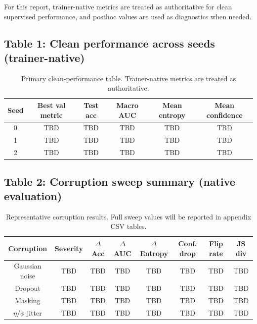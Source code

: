\documentclass[10pt]{article}
\begin{document}
For this report, trainer-native metrics are treated as authoritative for clean supervised performance, and posthoc values are used as diagnostics when needed.

\subsection*{Table 1: Clean performance across seeds (trainer-native)}
\begin{table}[h]
\centering
\small
\begin{tabular}{|c|c|c|c|c|c|}
\hline
Seed & Best val metric & Test acc & Macro AUC & Mean entropy & Mean confidence \\
\hline
0 & TBD & TBD & TBD & TBD & TBD \\
\hline
1 & TBD & TBD & TBD & TBD & TBD \\
\hline
2 & TBD & TBD & TBD & TBD & TBD \\
\hline
\end{tabular}
\caption{Primary clean-performance table. Trainer-native metrics are treated as authoritative.}
\end{table}

\subsection*{Table 2: Corruption sweep summary (native evaluation)}
\begin{table}[h]
\centering
\small
\begin{tabular}{|c|c|c|c|c|c|c|c|}
\hline
Corruption & Severity & $\Delta$Acc & $\Delta$AUC & $\Delta$Entropy & Conf. drop & Flip rate & JS div \\
\hline
Gaussian noise & TBD & TBD & TBD & TBD & TBD & TBD & TBD \\
\hline
Dropout & TBD & TBD & TBD & TBD & TBD & TBD & TBD \\
\hline
Masking & TBD & TBD & TBD & TBD & TBD & TBD & TBD \\
\hline
$\eta/\phi$ jitter & TBD & TBD & TBD & TBD & TBD & TBD & TBD \\
\hline
\end{tabular}
\caption{Representative corruption results. Full sweep values will be reported in appendix CSV tables.}
\end{table}
\end{document}
